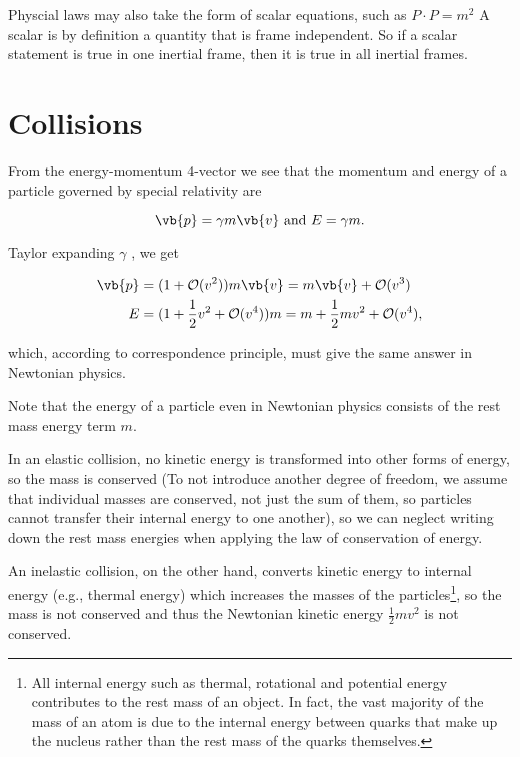 \documentclass[english,a4paper,12pt]{report}
\begin{document}
Physcial laws may also take the form of scalar equations, such as \(P \cdot P = m^2\) A scalar is by definition a quantity that is frame independent. So if a scalar statement is true in one inertial frame, then it is true in all inertial frames.  

\section{Collisions}

From the energy-momentum 4-vector we see that the momentum and energy of a particle governed by special relativity are

\begin{equation}
    \vb{p}  = \gamma m\vb{v} \text { and } E = \gamma m.
\end{equation}

Taylor expanding \(\gamma \) , we get

\begin{equation}
    \begin{aligned}
    \vb{p} &= (1 + \mathcal{O}(v^2)) m\vb{v} = m\vb{v} + \mathcal{O}(v^3 ) \\
    E &= (1 + \frac{1}{2}v^2 + \mathcal{O}(v^{4} ) ) m = m + \frac{1}{2}mv^2 + \mathcal{O}(v^{4} ), 
    \end{aligned}
\end{equation}

which, according to correspondence principle, must give the same answer in Newtonian physics. 

Note that the energy of a particle even in Newtonian physics consists of the rest mass energy term \(m\).  

In an elastic collision, no kinetic energy is transformed into other forms of energy, so the mass is conserved (To not introduce another degree of freedom, we assume that individual masses are conserved, not just the sum of them, so particles cannot transfer their internal energy to one another), so we can neglect writing down the rest mass energies when applying the law of conservation of energy.

An inelastic collision, on the other hand, converts kinetic energy to internal energy (e.g., thermal energy) which increases the masses of the particles\footnote{All internal energy such as thermal, rotational and potential energy contributes to the rest mass of an object. In fact, the vast majority of the mass of an atom is due to the internal energy between quarks that make up the nucleus rather than the rest mass of the quarks themselves.}, so the mass is not conserved and thus the Newtonian kinetic energy \(\frac{1}{2}mv^2\) is not conserved. 
\end{document}
